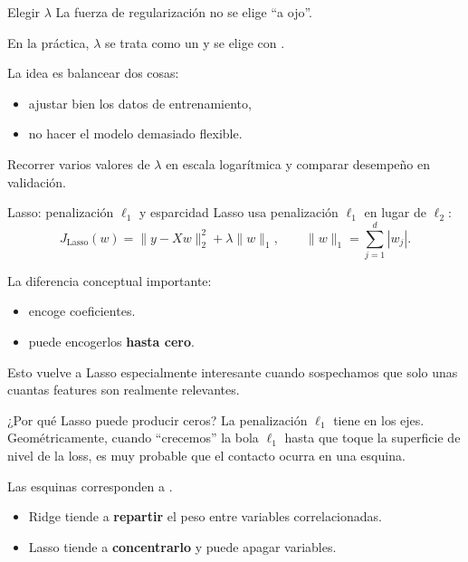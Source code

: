 \begin{frame}{Elegir $\lambda$}
La fuerza de regularización no se elige ``a ojo''.

\vspace{0.3em}
En la práctica, $\lambda$ se trata como un  y se elige con .

\vspace{0.3em}
La idea es balancear dos cosas:
\begin{itemize}\small
  \item ajustar bien los datos de entrenamiento,
  \item no hacer el modelo demasiado flexible.
\end{itemize}

\vspace{0.2em}
{\footnotesize Recorrer varios valores de $\lambda$ en escala logarítmica y comparar desempeño en validación.}
\end{frame}

\begin{frame}{Lasso: penalización $\ell_1$ y esparcidad}
Lasso usa penalización $\ell_1$ en lugar de $\ell_2$:
\[
J_{\mathrm{Lasso}}(w) = \|y-Xw\|_2^2 + \lambda\|w\|_1,
\qquad
\|w\|_1 = \sum_{j=1}^d |w_j|.
\]

\vspace{0.2em}
La diferencia conceptual importante:
\begin{itemize}\small
  \item {} encoge coeficientes.
  \item {} puede encogerlos \textbf{hasta cero}.
\end{itemize}

\vspace{0.2em}
Esto vuelve a Lasso especialmente interesante cuando sospechamos que solo unas cuantas features son realmente relevantes.
\end{frame}

\begin{frame}{¿Por qué Lasso puede producir ceros?}
La penalización $\ell_1$ tiene  en los ejes. Geométricamente, cuando ``crecemos'' la bola $\ell_1$ hasta que toque la superficie de nivel de la loss, es muy probable que el contacto ocurra en una esquina.

\vspace{0.3em}
Las esquinas corresponden a .

\vspace{0.3em}
\begin{itemize}\small
  \item Ridge tiende a \textbf{repartir} el peso entre variables correlacionadas.
  \item Lasso tiende a \textbf{concentrarlo} y puede apagar variables.
\end{itemize}
\end{frame}

